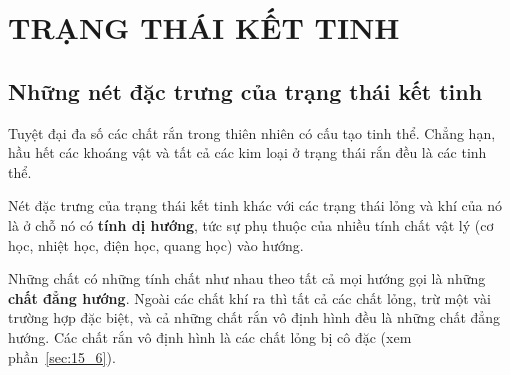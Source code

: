 
 
\chapter{TRẠNG THÁI KẾT TINH}\label{chap:13}


\section{Những nét đặc trưng của trạng thái kết tinh}\label{sec:13_1}


Tuyệt đại đa số các chất rắn trong thiên nhiên có cấu tạo tinh thể. Chẳng hạn, hầu hết các khoáng vật và tất cả các kim loại ở trạng thái rắn đều là các tinh thể.


Nét đặc trưng của trạng thái kết tinh khác với các trạng thái lỏng và khí của nó là ở chỗ nó có \textbf{tính dị hướng}, tức sự phụ thuộc của nhiều tính chất vật lý (cơ học, nhiệt học, điện học, quang học) vào hướng.


Những chất có những tính chất như nhau theo tất cả mọi hướng gọi là những \textbf{chất đẳng hướng}. Ngoài các chất khí ra thì tất cả các chất lỏng, trừ một vài trường hợp đặc biệt, và cả những chất rắn vô định hình đều là những chất đẳng hướng. Các chất rắn vô định hình là các chất lỏng bị cô đặc (xem phần~\ref{sec:15_6}).

